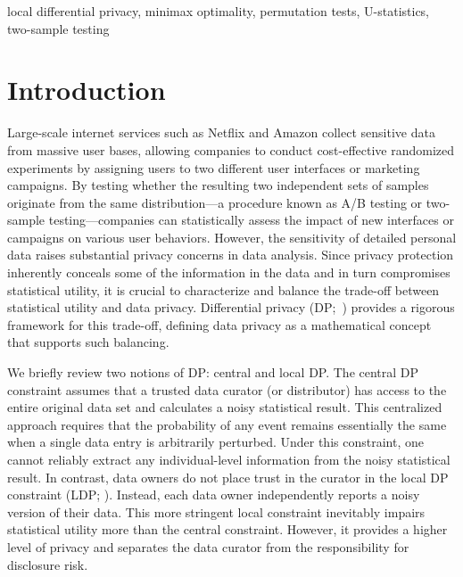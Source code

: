 \documentclass[twoside,11pt]{article}
\begin{document}
\begin{keywords}
 local differential privacy, minimax optimality, permutation tests, U-statistics, two-sample testing
\end{keywords}




\setcounter{tocdepth}{2}

\section{Introduction}\label{section_intro}
Large-scale internet services such as Netflix and Amazon collect sensitive data from massive user bases, allowing companies to conduct cost-effective randomized experiments by assigning users to two different user interfaces or marketing campaigns. By testing whether the resulting two independent sets of samples originate from the same distribution{---}a procedure known as A/B testing or two-sample testing{---}companies can statistically assess the impact of new interfaces or campaigns on various user behaviors. However, the sensitivity of detailed personal data raises substantial privacy concerns in data analysis. Since privacy protection inherently conceals some of the information in the data and in turn compromises statistical utility, it is crucial to characterize and balance the trade-off between statistical utility and data privacy. Differential privacy (DP;~\citet{CynthiaDwork2006CalibratingAnalysis}) provides a rigorous framework for this trade-off, defining data privacy as a mathematical concept that supports such balancing.

We briefly review two notions of DP: central and local DP.
The central DP constraint assumes that a trusted data curator (or distributor) has access to the entire original data set and calculates a noisy statistical result. This centralized approach requires that the probability of any event remains essentially the same when a single data entry is arbitrarily perturbed.
Under this constraint, one cannot reliably extract any individual-level information from the noisy statistical result. In contrast, data owners do not place trust in the curator in the local DP constraint (LDP; \citet{Kasiviswanathan2008WhatPrivately}). Instead, each data owner independently reports a noisy version of their data. This more stringent local constraint inevitably impairs statistical utility more than the central constraint. However, it provides a higher level of privacy and separates the data curator from the responsibility for disclosure risk.
\end{document}
